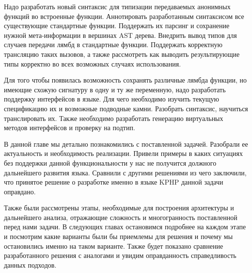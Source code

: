 Надо разработать новый синтаксис для типизации передаваемых анонимных функций во встроенные функции.
Аннотировать разработанным синтаксисом все существующие стандартные функции.
Поддержать их парсинг и сохранение нужной мета-информации в вершинах AST дерева.
Внедрить вывод типов для случаев передачи лямбд в стандартные функции.
Поддержать корректную трансляцию таких вызовов, а также рассмотреть как выводить результирующие типы корректно во всех возможных случаях использования.

Для того чтобы появилась возможность сохранять различные лямбда функции, но имеющие схожую сигнатуру в одну и ту же переменную, надо разработать поддержку интерфейсов в языке.
Для чего необходимо изучить текущую спецификацию их и возможные подводные камни.
Разобрать синтаксис, научиться транслировать их.
Также необходимо разработать генерацию виртуальных методов интерфейсов и проверку на подтип.

\chapterconclusion
В данной главе мы детально познакомились с поставленной задачей.
Разобрали ее актуальность и необходимость реализации.
Привели примеры в каких ситуациях без поддержки данной функциональности у нас не получится должного дальнейшего развития языка.
Сравнили с другими решениями из чего заключили, что принятое решение о разработке именно в языке KPHP данной задачи оправдано.

Также были рассмотрены этапы, необходимые для построения архитектуры и дальнейшего анализа, отражающие сложность и многогранность поставленной перед нами задачи.
В следующих главах остановимся подробнее на каждом этапе и посмотрим какие варианты были бы приемлемы для решения и почему мы остановились именно на таком варианте.
Также будет показано сравнение разработанного решения с аналогами и увидим оправданность справедливость данных подходов.
